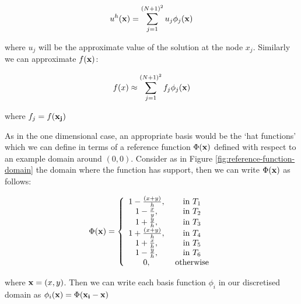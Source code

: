 \begin{equation}
    u^h(\mathbf{x}) = \sum_{j=1}^{(N+1)^2}u_j\phi_j(\mathbf{x})
\end{equation}

where $u_j$ will be the approximate value of the solution at the node $x_j$.
Similarly we can approximate $f(\mathbf{x})$:

\begin{equation}
    f(x) \approx \sum_{j=1}^{(N+1)^2}f_j\phi_j(\mathbf{x})
\end{equation}

where $f_j = f(\mathbf{x_j})$


As in the one dimensional case, an appropriate basis would be the `hat
functions' which we can define in terms of a reference function $\Phi(\mathbf{x})$
defined with respect to an example domain around $(0,0)$.  Consider as in
Figure \ref{fig:reference-function-domain} the domain where the function has
support, then we can write $\Phi(\mathbf{x})$ as follows:

\begin{equation}\label{eq:two-d-ref-basis-fn}
    \Phi(\mathbf{x}) = \left\{\begin{array}{c c}
                    1 - \frac{(x + y)}{h}, & \text{ in } T_1 \\
                    1 - \frac{x}{y},       & \text{ in } T_2 \\
                    1 + \frac{y}{h},       & \text{ in } T_3 \\
                    1 + \frac{(x + y)}{h}, & \text{ in } T_4 \\
                    1 + \frac{x}{h},       & \text{ in } T_5 \\
                    1 - \frac{y}{h},       & \text{ in } T_6 \\
                    0,                     & \text{ otherwise}
                  \end{array}\right.
\end{equation}

where $\mathbf{x} = (x, y)$. Then we can write each basis function $\phi_i$ in our
discretised domain as $\phi_i(\mathbf{x}) = \Phi(\mathbf{x_i} - \mathbf{x})$

